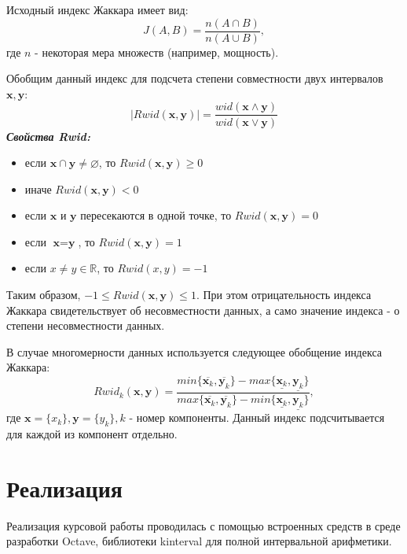 \documentclass[12pt,a4paper]{article}
\begin{document}
Исходный индекс Жаккара имеет вид:
\begin{equation}
    J(A,B)=\frac{n(A\cap{B})}{n(A\cup{B})},
\end{equation}
где $n$ - некоторая мера множеств (например, мощность).

Обобщим данный индекс для подсчета степени совместности двух интервалов $\textbf{x},\textbf{y}:$
\begin{equation}
    |Rwid(\textbf{x},\textbf{y})|=\frac{wid(\textbf{x}\wedge\textbf{y})}{wid(\textbf{x}\vee\textbf{y})}
\end{equation}
\newpage
\textbf{\textit{Свойства Rwid:}}
\begin{itemize}
    \item если $\textbf{x}\cap\textbf{y}\not=\varnothing$, то $Rwid(\textbf{x},\textbf{y})\geq0$
    \item иначе $Rwid(\textbf{x},\textbf{y})<0$
    \item если $\textbf{x}$ и $\textbf{y}$ пересекаются в одной точке, то $Rwid(\textbf{x},\textbf{y})=0$
    \item если $\textbf{x}=\textbf{y}$, то $Rwid(\textbf{x},\textbf{y})=1$
    \item если $x\not=y\in\mathbb{R}$, то $Rwid(x,y)=-1$
\end{itemize}

Таким образом, $-1\leq{Rwid(\textbf{x},\textbf{y})}\leq1$. При этом отрицательность индекса Жаккара свидетельствует об несовместности данных, а само значение индекса - о степени несовместности данных.

В случае многомерности данных используется следующее обобщение индекса Жаккара:
\begin{equation}
    Rwid_k(\textbf{x},\textbf{y})=\frac
    {min\{\overline{\textbf{x}_k},\overline{\textbf{y}_k}\}-max\{\underline{\textbf{x}_k},\underline{\textbf{y}_k}\}}
    {max\{\overline{\textbf{x}_k},\overline{\textbf{y}_k}\}-min\{\underline{\textbf{x}_k},\underline{\textbf{y}_k}\}},
\end{equation}
где $\textbf{x}=\{x_k\},\textbf{y}=\{y_k\},k$ - номер компоненты. Данный индекс подсчитывается для каждой из компонент отдельно.

\section{Реализация}
Реализация курсовой работы проводилась с помощью встроенных средств в среде разработки Octave, библиотеки kinterval для полной интервальной арифметики.
\end{document}

